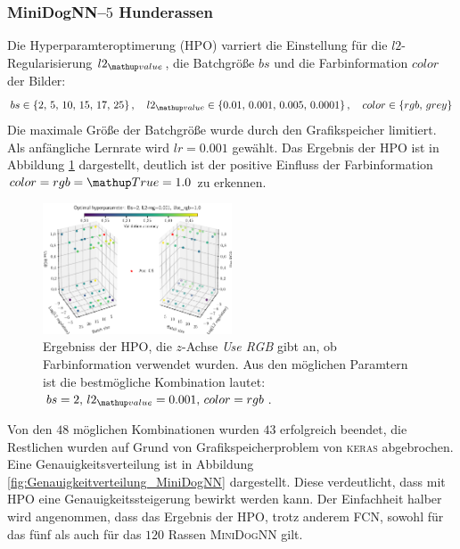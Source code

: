 \subsubsection{MiniDogNN--$5$ Hunderassen}
Die Hyperparamteroptimerung (HPO) varriert die Einstellung
für die $l2$-Regularisierung $l2\ua{value}$, die Batchgröße $bs$
und die Farbinformation $color$ der Bilder:
\begin{equation}
  \label{eq:Parameterraum_MiniDogNN}
  bs\in\left\{2,\, 5, \,10, \,15,\, 17,\, 25\right\}, \quad l2\ua{value}\in\left\{0.01, \,0.001,\, 0.005,\, 0.0001\right\}, \quad color\in\left\{rgb, \,grey\right\}
\end{equation}
Die maximale Größe der Batchgröße wurde durch den Grafikspeicher limitiert.
Als anfängliche Lernrate wird $lr=0.001$ gewählt.
Das Ergebnis der HPO ist in Abbildung \ref{fig:Hyperraum_MiniDogNN} dargestellt,
deutlich ist der positive Einfluss der Farbinformation $color=rgb=\map{True}=1.0$
zu erkennen.
\begin{figure}
\centering
\includegraphics[width=0.5\textwidth]{../../final_data/MiniNN_n5/hyper_raum.pdf}
\caption{Ergebniss der HPO, die $z$-Achse \emph{Use RGB} gibt an, ob Farbinformation
          verwendet wurden. Aus den möglichen Paramtern ist die bestmögliche Kombination
         lautet: $bs=2, \, l2\ua{value}=0.001, \, color=rgb$.}
\label{fig:Hyperraum_MiniDogNN}
\end{figure}
Von den $48$ möglichen Kombinationen wurden $43$ erfolgreich beendet, die Restlichen
wurden auf Grund von Grafikspeicherproblem von \textsc{keras} abgebrochen. Eine
Genauigkeitsverteilung ist in Abbildung \ref{fig:Genauigkeitverteilung_MiniDogNN}
dargestellt. Diese verdeutlicht, dass mit HPO
eine Genauigkeitssteigerung bewirkt werden kann. Der Einfachheit halber wird
angenommen, dass das Ergebnis der HPO, trotz anderem
FCN, sowohl für das fünf als auch für das $120$ Rassen \textsc{MiniDogNN} gilt.

